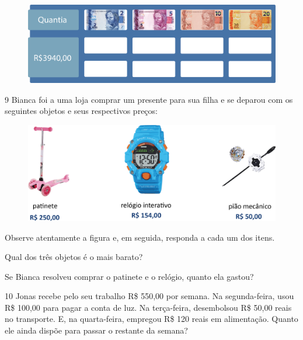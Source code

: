\begin{figure}[htpb!]
\centering
\includegraphics[width=\textwidth]{./media/image70.png}
\end{figure}


\num{9} Bianca foi a uma loja comprar um presente para sua filha e se deparou
com os seguintes objetos e seus respectivos preços:

\begin{figure}[htpb!]
\centering
\includegraphics[width=\textwidth]{./media/image72.png}
\end{figure}

Observe atentamente a figura e, em seguida, responda a cada um dos itens.

\begin{escolha}
\item Qual dos três objetos é o mais barato?

\item Se Bianca resolveu comprar o patinete e o relógio, quanto ela gastou?
\end{escolha}

\num{10} Jonas recebe pelo seu trabalho R\$ 550,00 por semana. Na segunda-feira, usou R\$ 100,00 para pagar a conta de luz. Na terça-feira, desembolsou R\$ 50,00 reais no transporte. E, na quarta-feira, empregou R\$ 120 reais em alimentação. Quanto ele ainda dispõe para passar o restante da semana?

